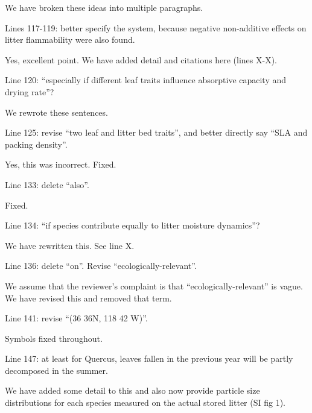 \documentclass[letterpaper, 12pt]{letter}
\begin{document}
\begin{letter}{}
We have broken these ideas into multiple paragraphs.

\begin{quoting}
  Lines 117-119: better specify the system, because negative non-additive
  effects on litter flammability were also found.
\end{quoting}

Yes, excellent point. We have added detail and citations here (lines X-X).

\begin{quoting}
  Line 120: “especially if different leaf traits influence absorptive capacity
  and drying rate”?
\end{quoting}

We rewrote these sentences.

\begin{quoting}
  Line 125: revise “two leaf and litter bed traits”, and better directly say
  “SLA and packing density”.
\end{quoting}

Yes, this was incorrect. Fixed.

\begin{quoting}
  Line 133: delete “also”.
\end{quoting}

Fixed.

\begin{quoting}
  Line 134: “if species contribute equally to litter moisture dynamics”?
\end{quoting}

We have rewritten this. See line X.

\begin{quoting}
  Line 136: delete “on”. Revise “ecologically-relevant”.
\end{quoting}

We assume that the reviewer's complaint is that ``ecologically-relevant'' is
vague. We have revised this and removed that term.

\begin{quoting}
Line 141: revise “(36 36N, 118 42 W)”.
\end{quoting}

Symbols fixed throughout.

\begin{quoting}
  Line 147: at least for Quercus, leaves fallen in the previous year will be
  partly decomposed in the summer.
\end{quoting}

We have added some detail to this and also now provide particle size
distributions for each species measured on the actual stored litter (SI fig 1).


\end{letter}
\end{document}
